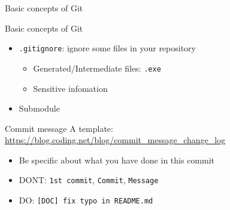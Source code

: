\documentclass{../TexTemplate/myslide}
\begin{document}
\begin{frame}{Basic concepts of Git}
\end{frame}

\begin{frame}[fragile]{Basic concepts of Git}
\begin{itemize}
	\item \verb'.gitignore': ignore some files in your repository
	\begin{itemize}
		\item Generated/Intermediate files: \verb'.exe'
		\item Sensitive infomation
	\end{itemize}
	\item Submodule
\end{itemize}
\end{frame}

\begin{frame}[fragile]{Commit message}
A template: \url{https://blog.coding.net/blog/commit_message_change_log}
\begin{itemize}
	\item Be specific about what you have done in this commit
	\item DONT: \verb'1st commit', \verb'Commit', \verb'Message'
	\item DO: \verb'[DOC] fix typo in README.md'
\end{itemize}
\end{frame}
\end{document}
